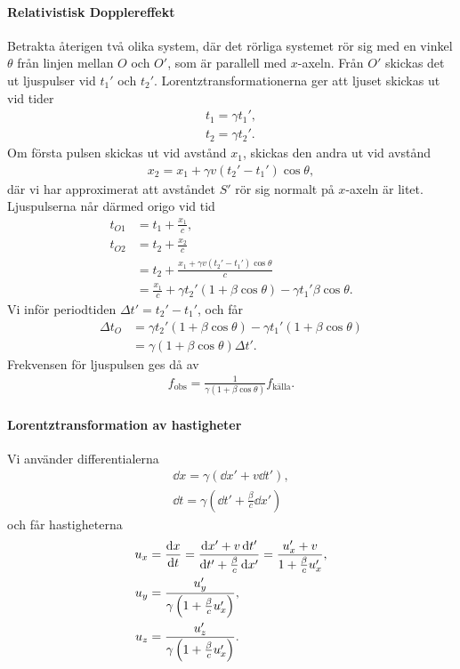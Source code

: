 \paragraph{Relativistisk Dopplereffekt}
Betrakta återigen två olika system, där det rörliga systemet rör sig med en vinkel $\theta$ från linjen mellan $O$ och $O'$, som är parallell med $x$-axeln. Från $O'$ skickas det ut ljuspulser vid $t_{1}'$ och $t_{2}'$. Lorentztransformationerna ger att ljuset skickas ut vid tider
\begin{align*}
	t_{1} = \gamma t_{1}', \\
	t_{2} = \gamma t_{2}'.
\end{align*}
Om första pulsen skickas ut vid avstånd $x_{1}$, skickas den andra ut vid avstånd
\begin{align*}
	x_{2} = x_{1} + \gamma v(t_{2}' - t_{1}')\cos{\theta},
\end{align*}
där vi har approximerat att avståndet $S'$ rör sig normalt på $x$-axeln är litet. Ljuspulserna når därmed origo vid tid
\begin{align*}
	t_{O1} &= t_{1} + \frac{x_{1}}{c}, \\
	t_{O2} &= t_{2} + \frac{x_{2}}{c} \\
	       &= t_{2} + \frac{x_{1} + \gamma v(t_{2}' - t_{1}')\cos{\theta}}{c} \\
	       &= \frac{x_{1}}{c} + \gamma t_{2}'(1 + \beta\cos{\theta}) - \gamma t_{1}'\beta\cos{\theta}.
\end{align*}
Vi inför periodtiden $\Delta t' = t_{2}' - t_{1}'$, och får
\begin{align*}
	\Delta t_{O} &= \gamma t_{2}'(1 + \beta\cos{\theta}) - \gamma t_{1}'(1 + \beta\cos{\theta}) \\
	             &= \gamma (1 + \beta\cos{\theta})\Delta t'.
\end{align*}
Frekvensen för ljuspulsen ges då av
\begin{align*}
	f_{\text{obs}} = \frac{1}{\gamma(1 + \beta\cos{\theta})}f_{\text{källa}}.
\end{align*}

\paragraph{Lorentztransformation av hastigheter}
Vi använder differentialerna
\begin{align*}
	\dd{x} = \gamma(\dd{x'} + v\dd{t'}), \\
	\dd{t} = \gamma(\dd{t'} + \frac{\beta}{c}\dd{x'})
\end{align*}
och får hastigheterna
\begin{align*}
	u_{x} &= \dv{x}{t} = \frac{\dd{x'} + v\dd{t'}}{\dd{t'} + \frac{\beta}{c}\dd{x'}} = \frac{u_{x}' + v}{1 + \frac{\beta}{c}u_{x}'}, \\
	u_{y} &= \frac{u_{y}'}{\gamma\left(1 + \frac{\beta}{c}u_{x}'\right)}, \\
	u_{z} &= \frac{u_{z}'}{\gamma\left(1 + \frac{\beta}{c}u_{x}'\right)}.
\end{align*}

